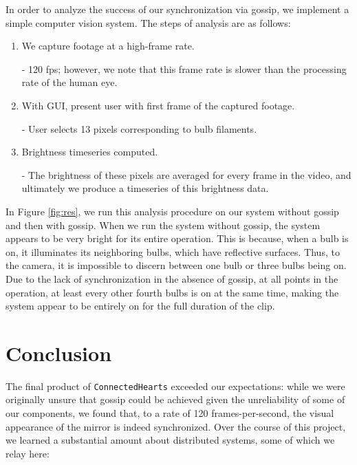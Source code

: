 \documentclass[preprint,review,12pt]{cs262}
\begin{document}
In order to analyze the success of our synchronization via gossip, we implement a simple computer vision system. The steps of analysis are as follows: 

\begin{enumerate} 
\item We capture footage at a high-frame rate. 

- 120 fps; however, we note that this frame rate is slower than the processing rate of the human eye. 

\item With GUI, present user with first frame of the captured footage. 

- User selects 13 pixels corresponding to bulb filaments. 

\item Brightness timeseries computed. 

- The brightness of these pixels are averaged for every frame in the video, and ultimately we produce a timeseries of this brightness data.
\end{enumerate}

In Figure \ref{fig:res}, we run this analysis procedure on our system without gossip and then with gossip. When we run the system without gossip, the system appears to be very bright for its entire operation. This is because, when a bulb is on, it illuminates its neighboring bulbs, which have reflective surfaces. Thus, to the camera, it is impossible to discern between one bulb or three bulbs being on. Due to the lack of synchronization in the absence of gossip, at all points in the operation, at least every other fourth bulbs is on at the same time, making the system appear to be entirely on for the full duration of the clip. 


\section{Conclusion}

The final product of \texttt{ConnectedHearts} exceeded our expectations: while we were originally unsure that gossip could be achieved given the unreliability of some of our components, we found that, to a rate of 120 frames-per-second, the visual appearance of the mirror is indeed synchronized. Over the course of this project, we learned a substantial amount about distributed systems, some of which we relay here: 
\end{document}
